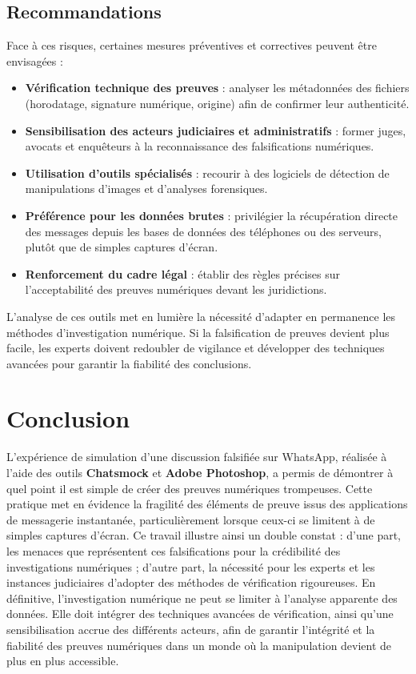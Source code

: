 \documentclass[12pt, a4paper]{article}
\begin{document}
\subsection{Recommandations}
Face à ces risques, certaines mesures préventives et correctives peuvent être envisagées :  
\begin{itemize}
	\item \textbf{Vérification technique des preuves} : analyser les métadonnées des fichiers (horodatage, signature numérique, origine) afin de confirmer leur authenticité.  
	\item \textbf{Sensibilisation des acteurs judiciaires et administratifs} : former juges, avocats et enquêteurs à la reconnaissance des falsifications numériques.  
	\item \textbf{Utilisation d’outils spécialisés} : recourir à des logiciels de détection de manipulations d’images et d’analyses forensiques.  
	\item \textbf{Préférence pour les données brutes} : privilégier la récupération directe des messages depuis les bases de données des téléphones ou des serveurs, plutôt que de simples captures d’écran.  
	\item \textbf{Renforcement du cadre légal} : établir des règles précises sur l’acceptabilité des preuves numériques devant les juridictions.  
\end{itemize}

L’analyse de ces outils met en lumière la nécessité d’adapter en permanence les méthodes d’investigation numérique. Si la falsification de preuves devient plus facile, les experts doivent redoubler de vigilance et développer des techniques avancées pour garantir la fiabilité des conclusions.  
\newpage
{}
\section*{Conclusion}
L’expérience de simulation d’une discussion falsifiée sur WhatsApp, réalisée à l’aide des outils \textbf{Chatsmock} et \textbf{Adobe Photoshop}, a permis de démontrer à quel point il est simple de créer des preuves numériques trompeuses. Cette pratique met en évidence la fragilité des éléments de preuve issus des applications de messagerie instantanée, particulièrement lorsque ceux-ci se limitent à de simples captures d’écran. Ce travail illustre ainsi un double constat : d’une part, les menaces que représentent ces falsifications pour la crédibilité des investigations numériques ; d’autre part, la nécessité pour les experts et les instances judiciaires d’adopter des méthodes de vérification rigoureuses. En définitive, l’investigation numérique ne peut se limiter à l’analyse apparente des données. Elle doit intégrer des techniques avancées de vérification, ainsi qu’une sensibilisation accrue des différents acteurs, afin de garantir l’intégrité et la fiabilité des preuves numériques dans un monde où la manipulation devient de plus en plus accessible.  
\newpage
\end{document}
